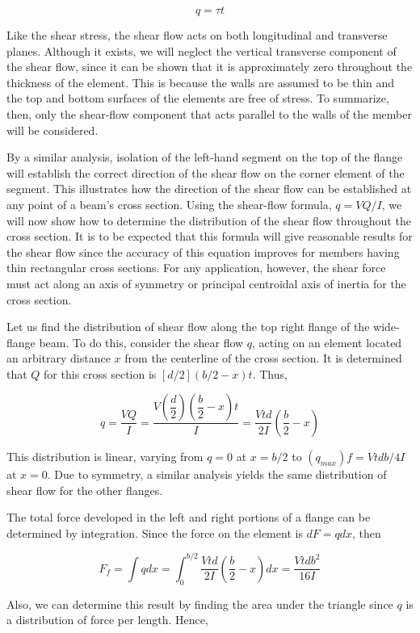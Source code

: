 \documentclass[
10pt,
a4paper,
openany,
svgnames,
]{book} %
\begin{document}
\[q = \tau t\]

Like the shear stress, the shear flow acts on both longitudinal and transverse planes. Although it exists, we will neglect the vertical transverse component of the shear flow, since it can be shown that it is approximately zero throughout the thickness of the element. This is because the walls are assumed to be thin and the top and bottom surfaces of the elements are free of stress. To summarize, then, only the shear-flow component that acts parallel to the walls of the member will be considered.

By a similar analysis, isolation of the left-hand segment on the top of the flange will establish the correct direction of the shear flow on the corner element of the segment. This illustrates how the direction of the shear flow can be established at any point of a beam’s cross section. Using the shear-flow formula, $q = VQ/I$, we will now show how to determine the distribution of the shear flow throughout the cross section. It is to be expected that this formula will give reasonable results for the shear flow since the accuracy of this equation improves for members having thin rectangular cross sections. For any application, however, the shear force must act along an axis of symmetry or principal centroidal axis of inertia for the cross section.

Let us find the distribution of shear flow along the top right flange of the wide-flange beam. To do this, consider the shear flow $q$, acting on an element located an arbitrary distance $x$ from the centerline of the cross section. It is determined that $Q$ for this cross section is $[d/2](b/2 - x)t$. Thus,

\[q = \frac{VQ}{I} = \frac{V \left( \dfrac{d}{2} \right)\left( \dfrac{b}{2} - x \right)t}{I} = \frac{Vtd}{2I}\left( \frac{b}{2} - x \right)\]

This distribution is linear, varying from $q = 0$ at $x = b/2$ to $(q_{max})f = Vtdb/4I$ at $x = 0$. Due to symmetry, a similar analysis yields the same distribution of shear flow for the other flanges.

The total force developed in the left and right portions of a flange can be determined by integration. Since the force on the element is $dF = qdx$, then

\[F_f = \int qdx  = \int_0^{b/2} \frac{Vtd}{2I}\left( \frac{b}{2} - x \right)dx  = \frac{Vtdb^2}{16I}\]

Also, we can determine this result by finding the area under the triangle since $q$ is a distribution of force per length. Hence,
\end{document}
